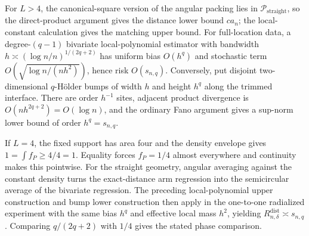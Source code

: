 For \(L>4\), the canonical-square version of the angular packing lies in \(\mathcal P_{\mathrm{straight}}\), so the direct-product argument gives the distance lower bound \(ca_n\); the local-constant calculation gives the matching upper bound.  For full-location data, a degree-\((q-1)\) bivariate local-polynomial estimator with bandwidth \(h\asymp(\log n/n)^{1/(2q+2)}\) has uniform bias \(O(h^q)\) and stochastic term \(O(\sqrt{\log n/(nh^2)})\), hence risk \(O(s_{n,q})\).  Conversely, put disjoint two-dimensional \(q\)-H\"older bumps of width \(h\) and height \(h^q\) along the trimmed interface.  There are order \(h^{-1}\) sites, adjacent product divergence is \(O(nh^{2q+2})=O(\log n)\), and the ordinary Fano argument gives a sup-norm lower bound of order \(h^q=s_{n,q}\).

If \(L=4\), the fixed support has area four and the density envelope gives \(1=\int f_P\geq4/4=1\).  Equality forces \(f_P=1/4\) almost everywhere and continuity makes this pointwise.  For the straight geometry, angular averaging against the constant density turns the exact-distance arm regression into the semicircular average of the bivariate regression.  The preceding local-polynomial upper construction and bump lower construction then apply in the one-to-one radialized experiment with the same bias \(h^q\) and effective local mass \(h^2\), yielding \(R_{n,\delta}^{\mathrm{dist}}\asymp s_{n,q}\).  Comparing \(q/(2q+2)\) with \(1/4\) gives the stated phase comparison.